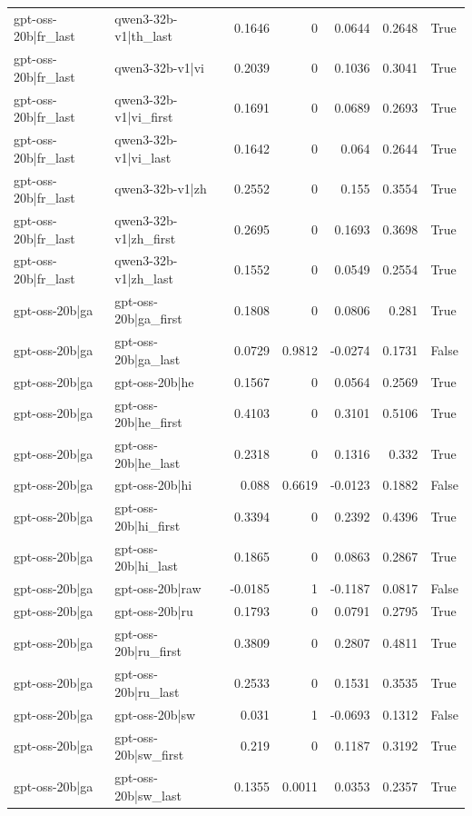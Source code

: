 \begin{table}
\begin{tabular}{l l r r r r l}
gpt-oss-20b|fr_last & qwen3-32b-v1|th_last & 0.1646 & 0 & 0.0644 & 0.2648 & True \\
gpt-oss-20b|fr_last & qwen3-32b-v1|vi & 0.2039 & 0 & 0.1036 & 0.3041 & True \\
gpt-oss-20b|fr_last & qwen3-32b-v1|vi_first & 0.1691 & 0 & 0.0689 & 0.2693 & True \\
gpt-oss-20b|fr_last & qwen3-32b-v1|vi_last & 0.1642 & 0 & 0.064 & 0.2644 & True \\
gpt-oss-20b|fr_last & qwen3-32b-v1|zh & 0.2552 & 0 & 0.155 & 0.3554 & True \\
gpt-oss-20b|fr_last & qwen3-32b-v1|zh_first & 0.2695 & 0 & 0.1693 & 0.3698 & True \\
gpt-oss-20b|fr_last & qwen3-32b-v1|zh_last & 0.1552 & 0 & 0.0549 & 0.2554 & True \\
gpt-oss-20b|ga & gpt-oss-20b|ga_first & 0.1808 & 0 & 0.0806 & 0.281 & True \\
gpt-oss-20b|ga & gpt-oss-20b|ga_last & 0.0729 & 0.9812 & -0.0274 & 0.1731 & False \\
gpt-oss-20b|ga & gpt-oss-20b|he & 0.1567 & 0 & 0.0564 & 0.2569 & True \\
gpt-oss-20b|ga & gpt-oss-20b|he_first & 0.4103 & 0 & 0.3101 & 0.5106 & True \\
gpt-oss-20b|ga & gpt-oss-20b|he_last & 0.2318 & 0 & 0.1316 & 0.332 & True \\
gpt-oss-20b|ga & gpt-oss-20b|hi & 0.088 & 0.6619 & -0.0123 & 0.1882 & False \\
gpt-oss-20b|ga & gpt-oss-20b|hi_first & 0.3394 & 0 & 0.2392 & 0.4396 & True \\
gpt-oss-20b|ga & gpt-oss-20b|hi_last & 0.1865 & 0 & 0.0863 & 0.2867 & True \\
gpt-oss-20b|ga & gpt-oss-20b|raw & -0.0185 & 1 & -0.1187 & 0.0817 & False \\
gpt-oss-20b|ga & gpt-oss-20b|ru & 0.1793 & 0 & 0.0791 & 0.2795 & True \\
gpt-oss-20b|ga & gpt-oss-20b|ru_first & 0.3809 & 0 & 0.2807 & 0.4811 & True \\
gpt-oss-20b|ga & gpt-oss-20b|ru_last & 0.2533 & 0 & 0.1531 & 0.3535 & True \\
gpt-oss-20b|ga & gpt-oss-20b|sw & 0.031 & 1 & -0.0693 & 0.1312 & False \\
gpt-oss-20b|ga & gpt-oss-20b|sw_first & 0.219 & 0 & 0.1187 & 0.3192 & True \\
gpt-oss-20b|ga & gpt-oss-20b|sw_last & 0.1355 & 0.0011 & 0.0353 & 0.2357 & True \\

\end{tabular}
\end{table}
